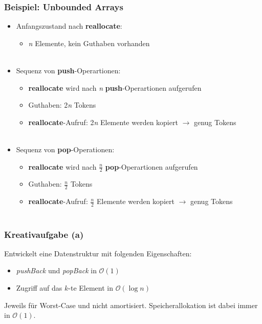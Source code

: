 \begin{frame}
	\frametitle{Beispiel: Unbounded Arrays}
	\begin{itemize}
		\item Anfangszustand nach \textbf{reallocate}:
		\begin{itemize}
			\item \textit{n} Elemente, kein Guthaben vorhanden \\ \ \\
		\end{itemize}


		\item Sequenz von \textbf{push}-Operartionen:
		\begin{itemize}
			\item \textbf{reallocate} wird nach \textit{n} \textbf{push}-Operartionen aufgerufen
			\item Guthaben: 2\textit{n} Tokens
			\item \textbf{reallocate}-Aufruf: 2\textit{n} Elemente werden kopiert $\rightarrow$ genug Tokens \\ \ \\
		\end{itemize} 

		\item Sequenz von \textbf{pop}-Operationen:
		\begin{itemize}
			\item \textbf{reallocate} wird nach \textit{$\frac{n}{2}$} \textbf{pop}-Operartionen aufgerufen
			\item Guthaben: \textit{$\frac{n}{2}$} Tokens
			\item \textbf{reallocate}-Aufruf: \textit{$\frac{n}{2}$} Elemente werden kopiert $\rightarrow$ genug Tokens \\ \ \\
		\end{itemize} 

	\end{itemize}
\end{frame}


\begin{frame}
	\frametitle{Kreativaufgabe (a)}
	Entwickelt eine Datenstruktur mit folgenden Eigenschaften:

	\begin{itemize}
		\item \emph{pushBack} und \emph{popBack} in $\mathcal{O}(1)$
		\item Zugriff auf das $k$-te Element in $\mathcal{O}(\log{n})$
	\end{itemize}

	Jeweils für Worst-Case und nicht amortisiert.
	Speicherallokation ist dabei immer in $\mathcal{O}(1)$.
\end{frame}

